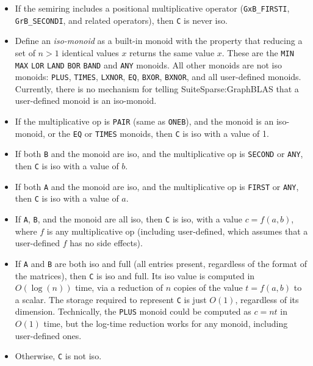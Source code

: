 \documentclass[12pt]{article}
\begin{document}
    \begin{itemize}
    \item If the semiring includes a positional multiplicative operator
    (\verb'GxB_FIRSTI', \verb'GrB_SECONDI', and related operators), then
    \verb'C' is never iso.

    \item Define an {\em iso-monoid} as a built-in monoid with the property
    that reducing a set of $n>1$ identical values $x$ returns the same value
    $x$.  These are the \verb'MIN' \verb'MAX' \verb'LOR' \verb'LAND' \verb'BOR'
    \verb'BAND' and \verb'ANY' monoids.  All other monoids are not iso monoids:
    \verb'PLUS', \verb'TIMES', \verb'LXNOR', \verb'EQ', \verb'BXOR',
    \verb'BXNOR', and all user-defined monoids.   Currently, there is no
    mechanism for telling SuiteSparse:GraphBLAS that a user-defined monoid
    is an iso-monoid.

    \item If the multiplicative op is \verb'PAIR' (same as \verb'ONEB'),
    and the monoid is an
    iso-monoid, or the \verb'EQ' or \verb'TIMES' monoids, then \verb'C' is
    iso with a value of 1.

    \item If both \verb'B' and the monoid are iso, and the multiplicative op is
    \verb'SECOND' or \verb'ANY', then \verb'C' is iso with a value of $b$.

    \item If both \verb'A' and the monoid are iso, and the multiplicative op is
    \verb'FIRST' or \verb'ANY', then \verb'C' is iso with a value of $a$.

    \item If \verb'A', \verb'B', and the monoid are all iso, then \verb'C'
    is iso, with a value $c=f(a,b)$, where $f$ is any multiplicative op
    (including user-defined, which assumes that a user-defined $f$ has no 
    side effects).

    \item If \verb'A' and \verb'B' are both iso and full (all entries present,
    regardless of the format of the matrices), then \verb'C' is iso and full.
    Its iso value is computed in $O(\log(n))$ time, via a reduction of $n$
    copies of the value $t=f(a,b)$ to a scalar.  The storage required to
    represent \verb'C' is just $O(1)$, regardless of its dimension.
    Technically, the \verb'PLUS' monoid could be computed as $c=nt$ in $O(1)$
    time, but the log-time reduction works for any monoid, including
    user-defined ones.

    \item Otherwise, \verb'C' is not iso.
    \end{itemize}
\end{document}
